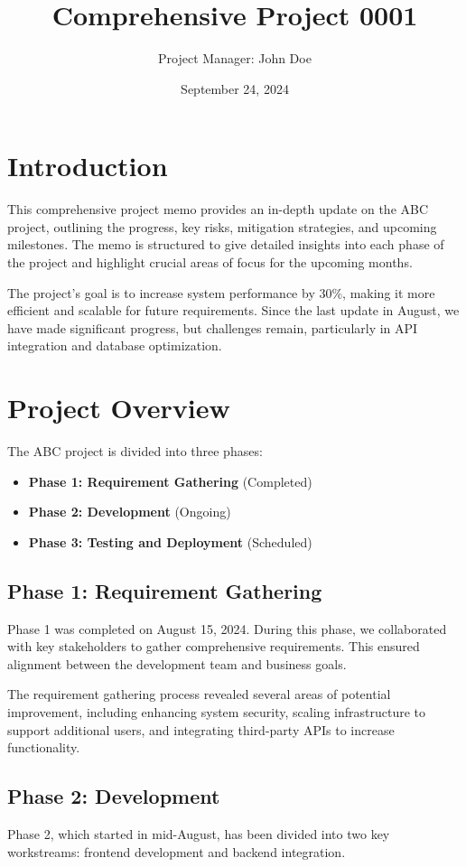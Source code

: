 \documentclass[12pt]{article}
\title{Comprehensive Project 0001}
\author{Project Manager: John Doe}
\date{September 24, 2024}
\begin{document}
\maketitle

\tableofcontents
\newpage

\section{Introduction}
This comprehensive project memo provides an in-depth update on the ABC project, outlining the progress, key risks, mitigation strategies, and upcoming milestones. The memo is structured to give detailed insights into each phase of the project and highlight crucial areas of focus for the upcoming months.

The project’s goal is to increase system performance by 30\%, making it more efficient and scalable for future requirements. Since the last update in August, we have made significant progress, but challenges remain, particularly in API integration and database optimization.

\section{Project Overview}
The ABC project is divided into three phases:
\begin{itemize}
    \item \textbf{Phase 1: Requirement Gathering} (Completed)
    \item \textbf{Phase 2: Development} (Ongoing)
    \item \textbf{Phase 3: Testing and Deployment} (Scheduled)
\end{itemize}

\subsection{Phase 1: Requirement Gathering}
Phase 1 was completed on August 15, 2024. During this phase, we collaborated with key stakeholders to gather comprehensive requirements. This ensured alignment between the development team and business goals.

The requirement gathering process revealed several areas of potential improvement, including enhancing system security, scaling infrastructure to support additional users, and integrating third-party APIs to increase functionality.

\subsection{Phase 2: Development}
Phase 2, which started in mid-August, has been divided into two key workstreams: frontend development and backend integration.
\end{document}
